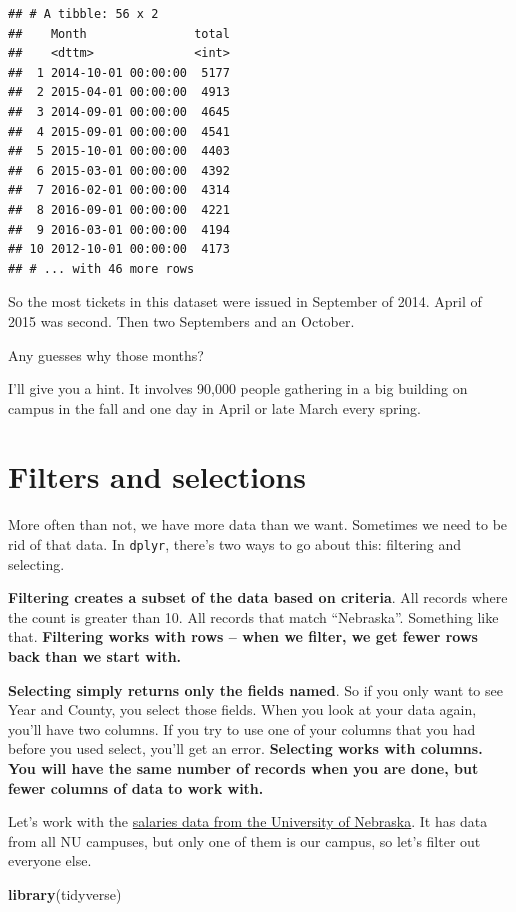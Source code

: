 \documentclass[]{book}
\newenvironment{Shaded}{\begin{snugshade}}{\end{snugshade}}
\newcommand{\KeywordTok}[1]{\textcolor[rgb]{0.13,0.29,0.53}{\textbf{#1}}}
\newcommand{\NormalTok}[1]{#1}
\begin{document}
\begin{verbatim}
## # A tibble: 56 x 2
##    Month               total
##    <dttm>              <int>
##  1 2014-10-01 00:00:00  5177
##  2 2015-04-01 00:00:00  4913
##  3 2014-09-01 00:00:00  4645
##  4 2015-09-01 00:00:00  4541
##  5 2015-10-01 00:00:00  4403
##  6 2015-03-01 00:00:00  4392
##  7 2016-02-01 00:00:00  4314
##  8 2016-09-01 00:00:00  4221
##  9 2016-03-01 00:00:00  4194
## 10 2012-10-01 00:00:00  4173
## # ... with 46 more rows
\end{verbatim}

So the most tickets in this dataset were issued in September of 2014. April of 2015 was second. Then two Septembers and an October.

Any guesses why those months?

I'll give you a hint. It involves 90,000 people gathering in a big building on campus in the fall and one day in April or late March every spring.

\hypertarget{filters-and-selections}{%
\chapter{Filters and selections}\label{filters-and-selections}}

More often than not, we have more data than we want. Sometimes we need to be rid of that data. In \texttt{dplyr}, there's two ways to go about this: filtering and selecting.

\textbf{Filtering creates a subset of the data based on criteria}. All records where the count is greater than 10. All records that match ``Nebraska''. Something like that. \textbf{Filtering works with rows -- when we filter, we get fewer rows back than we start with.}

\textbf{Selecting simply returns only the fields named}. So if you only want to see Year and County, you select those fields. When you look at your data again, you'll have two columns. If you try to use one of your columns that you had before you used select, you'll get an error. \textbf{Selecting works with columns. You will have the same number of records when you are done, but fewer columns of data to work with.}

Let's work with the \href{https://unl.box.com/s/9826nisk29fztlc1xhup988eah0mqdby}{salaries data from the University of Nebraska}. It has data from all NU campuses, but only one of them is our campus, so let's filter out everyone else.

\begin{Shaded}
\begin{Highlighting}[]
\KeywordTok{library}\NormalTok{(tidyverse)}
\end{Highlighting}
\end{Shaded}
\end{document}
